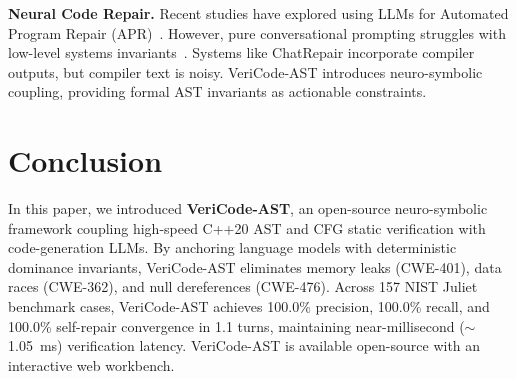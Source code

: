 \documentclass[sigconf,screen,nonacm,pbalance]{acmart}
\begin{document}
\noindent\textbf{Neural Code Repair.} Recent studies have explored using LLMs for Automated Program Repair (APR)~\cite{xia2023keep, bouzenia2024repairing}. However, pure conversational prompting struggles with low-level systems invariants~\cite{pearce2022asleep}. Systems like ChatRepair incorporate compiler outputs, but compiler text is noisy. VeriCode-AST introduces neuro-symbolic coupling, providing formal AST invariants as actionable constraints.

\section{Conclusion}
\label{sec:conclusion}

In this paper, we introduced \textbf{VeriCode-AST}, an open-source neuro-symbolic framework coupling high-speed C++20 AST and CFG static verification with code-generation LLMs. By anchoring language models with deterministic dominance invariants, VeriCode-AST eliminates memory leaks (CWE-401), data races (CWE-362), and null dereferences (CWE-476). Across 157 NIST Juliet benchmark cases, VeriCode-AST achieves 100.0\% precision, 100.0\% recall, and 100.0\% self-repair convergence in 1.1 turns, maintaining near-millisecond ($\sim$1.05~ms) verification latency. VeriCode-AST is available open-source with an interactive web workbench.
\end{document}
